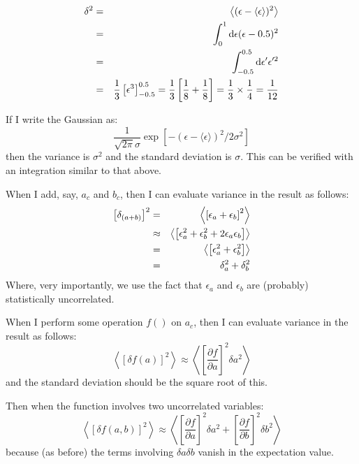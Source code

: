 \begin{answer}
  \begin{eqnarray}
    \delta^2 &=& \left\langle (\epsilon - \langle\epsilon\rangle)^2
    \right\rangle \cr
    &=& \int_0^1 {\rm d}\epsilon  (\epsilon - 0.5)^2 \cr
    &=& \int_{-0.5}^{0.5} {\rm d}\epsilon'  \epsilon'^2 \cr
    &=& \frac{1}{3}\left[\epsilon^3\right]^{0.5}_{-0.5}
      = \frac{1}{3}\left[\frac{1}{8} + \frac{1}{8}\right]
        = \frac{1}{3} \times \frac{1}{4} = \frac{1}{12}
  \end{eqnarray}
\end{answer}


\begin{answer}
  If I write the Gaussian as:
  \begin{equation}
    \frac{1}{\sqrt{2\pi}\sigma} \exp\left[ -
      \left(\epsilon-\langle\epsilon\rangle\right)^2 / 2\sigma^2\right]
  \end{equation}
  then the variance is $\sigma^2$ and the standard deviation is
  $\sigma$. This can be verified with an integration similar to
  that above. 
\end{answer}

When I add, say, $a_c$ and $b_c$, then I can evaluate variance in the
result as follows:
\begin{eqnarray}
  \left[\delta_{(a+b)}\right]^2 &=& \left\langle \left[\epsilon_a +
    \epsilon_b\right]^2 \right\rangle \cr
    &\approx& \left\langle \left[\epsilon_a^2 + \epsilon_b^2 + 2
      \epsilon_a \epsilon_b \right] \right\rangle \cr
    &=& \left\langle \left[\epsilon_a^2 + \epsilon_b^2 \right]
    \right\rangle\cr
    &=& \delta_a^2 + \delta_b^2
\end{eqnarray}
Where, very importantly, we use the fact that $\epsilon_a$ and
$\epsilon_b$ are (probably) statistically uncorrelated.

When I perform some operation $f()$ on $a_c$, then I can evaluate
variance in the result as follows:
\begin{equation}
\left\langle \left[\delta f(a)\right]^2 \right\rangle \approx 
\left\langle \left[\frac{\partial f}{\partial a}\right]^2 \delta a^2
\right\rangle
\end{equation}
and the standard deviation should be the square root of this.

Then when the function involves two uncorrelated variables:
\begin{equation}
\left\langle \left[\delta f(a, b)\right]^2 \right\rangle \approx 
\left\langle
\left[\frac{\partial f}{\partial a}\right]^2 \delta a^2
+ \left[\frac{\partial f}{\partial b}\right]^2 \delta b^2
\right\rangle
\end{equation}
because (as before) the terms involving $\delta a \delta b$ vanish in
the expectation value.

